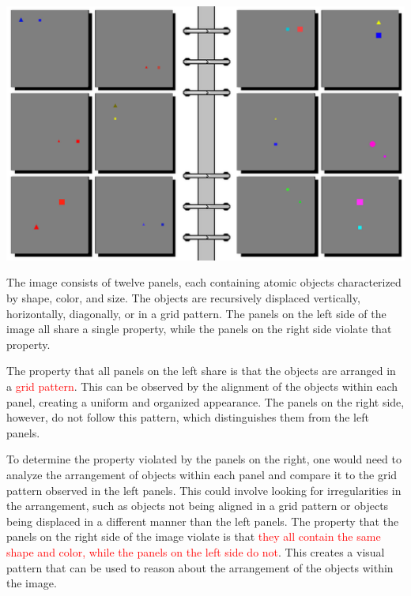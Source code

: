 \begin{tcolorbox}[breakable,enhanced jigsaw,opacityback=0,]
	\centering
	\includegraphics[width=.8\linewidth]{imgs/bongard/easy-13.png}\\
	\begin{dialogue}
		 The image consists of twelve panels, each containing atomic objects characterized by shape, color, and size. The objects are recursively displaced vertically, horizontally, diagonally, or in a grid pattern. The panels on the left side of the image all share a single property, while the panels on the right side violate that property.
		
		The property that all panels on the left share is that the objects are arranged in a \textcolor{red}{grid pattern}. This can be observed by the alignment of the objects within each panel, creating a uniform and organized appearance. The panels on the right side, however, do not follow this pattern, which distinguishes them from the left panels.
		
		To determine the property violated by the panels on the right, one would need to analyze the arrangement of objects within each panel and compare it to the grid pattern observed in the left panels. This could involve looking for irregularities in the arrangement, such as objects not being aligned in a grid pattern or objects being displaced in a different manner than the left panels.
		\vspace{1em}
		 The property that the panels on the right side of the image violate is that \textcolor{red}{they all contain the same shape and color, while the panels on the left side do not}. This creates a visual pattern that can be used to reason about the arrangement of the objects within the image.
		

\end{dialogue}
\end{tcolorbox}
